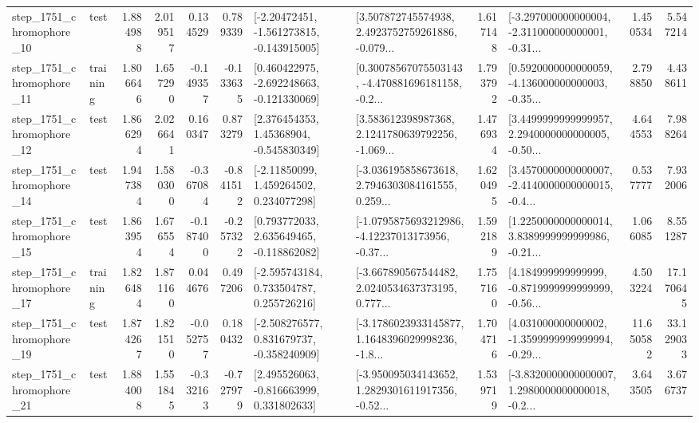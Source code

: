 \begin{tabular}{llrrrrllrlrr}
 step\_1751\_chromophore\_10 &      test &      1.884988 &    2.019517 &      0.134529 &  0.789339 &   [-2.20472451, -1.561273815, -0.143915005] &  [3.507872745574938, 2.4923752759261886, -0.079... &       1.617148 &  [-3.297000000000004, -2.311000000000001, -0.31... &            1.450534 &          5.547214 \\
 step\_1751\_chromophore\_11 &  training &      1.806646 &    1.657290 &     -0.149357 & -0.133635 &   [0.460422975, -2.692248663, -0.121330069] &  [0.30078567075503143, -4.470881696181158, -0.2... &       1.793792 &  [0.5920000000000059, -4.136000000000003, -0.35... &            2.798850 &          4.438611 \\
 step\_1751\_chromophore\_12 &      test &      1.866294 &    2.026641 &      0.160347 &  0.873279 &     [2.376454353, 1.45368904, -0.545830349] &  [3.583612398987368, 2.1241780639792256, -1.069... &       1.476934 &  [3.4499999999999957, 2.2940000000000005, -0.50... &            4.644553 &          7.988264 \\
 step\_1751\_chromophore\_14 &      test &      1.947384 &    1.580300 &     -0.367084 & -0.841512 &     [-2.11850099, 1.459264502, 0.234077298] &  [-3.036195858673618, 2.7946303084161555, 0.259... &       1.620495 &  [3.4570000000000007, -2.4140000000000015, -0.4... &            0.537777 &          7.932006 \\
 step\_1751\_chromophore\_15 &      test &      1.863954 &    1.676554 &     -0.187400 & -0.257322 &    [0.793772033, 2.635649465, -0.118862082] &  [-1.0795875693212986, -4.12237013173956, -0.37... &       1.592189 &  [1.2250000000000014, 3.8389999999999986, -0.21... &            1.066085 &          8.551287 \\
 step\_1751\_chromophore\_17 &  training &      1.826484 &    1.871160 &      0.044676 &  0.497206 &    [-2.595743184, 0.733504787, 0.255726216] &  [-3.667890567544482, 2.0240534637373195, 0.777... &       1.757160 &  [4.184999999999999, -0.8719999999999999, -0.56... &            4.503224 &         17.170645 \\
 step\_1751\_chromophore\_19 &      test &      1.874267 &    1.821510 &     -0.052757 &  0.180432 &   [-2.508276577, 0.831679737, -0.358240909] &  [-3.1786023933145877, 1.1648396029998236, -1.8... &       1.704716 &  [4.031000000000002, -1.3599999999999994, -0.29... &           11.650582 &         33.129033 \\
 step\_1751\_chromophore\_21 &      test &      1.884008 &    1.551845 &     -0.332163 & -0.727979 &    [2.495526063, -0.816663999, 0.331802633] &  [-3.950095034143652, 1.2829301611917356, -0.52... &       1.539719 &  [-3.8320000000000007, 1.2980000000000018, -0.2... &            3.643505 &          3.676737 \\

\end{tabular}
